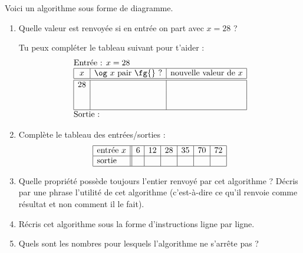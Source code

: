 \documentclass[class=report,crop=false, 12pt]{standalone}
\begin{document}
\begin{activite}
Voici un algorithme sous forme de diagramme.


\begin{enumerate}
    \item Quelle valeur est renvoyée si en entrée on part avec $x = 28$ ?
    
    Tu peux compléter le tableau suivant pour t'aider :
  $$
  \begin{array}{l}
  \text{Entrée : $x=28$}    \\
  \begin{array}{|c|c|c|}
  \hline  
   x & \text{\og $x$ pair \fg{} ?} & \text{nouvelle valeur de } x \\
  \hline\hline 
  28 &  &  \\
   &  &  \\
   &  &  \\
  \hline
  \end{array} \\
  \text{Sortie : }  
  \end{array} 
  $$ 
    
    
    
    
    
    \item Complète le tableau des entrées/sorties : 
        $$\begin{array}{|l||c|c|c|c|c|c|c|c|}
  \hline
  \text{entrée } x & 6&12&28&35&70&72\\
  \hline
  \text{sortie } & &&&&& \\
  \hline
  \end{array}  
  $$ 
    \item Quelle propriété possède toujours l'entier renvoyé par cet algorithme ? Décris par une phrase l'utilité de cet algorithme (c'est-à-dire ce qu'il renvoie comme résultat et non comment il le fait).
    
    
    \item Récris cet algorithme sous la forme d'instructions \og{}ligne par ligne\fg{}.

    \item Quels sont les nombres pour lesquels l'algorithme ne s'arrête pas ?
\end{enumerate}

\end{activite}
\end{document}
